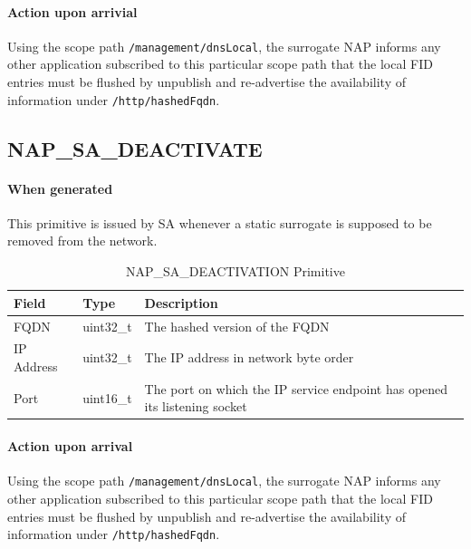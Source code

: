 \documentclass[a4paper,11pt,titlepage]{report}
\begin{document}
\paragraph{Action upon arrivial} Using the scope path \texttt{/management/dnsLocal}, the surrogate \ac{NAP} informs any other application subscribed to this particular scope path that the local \ac{FID} entries must be flushed by unpublish and re-advertise the availability of information under \texttt{/http/hashedFqdn}.

\subsection{NAP\_SA\_DEACTIVATE}

\paragraph{When generated} This primitive is issued by \ac{SA} whenever a static surrogate is supposed to be removed from the network.

\begin{table}[h]
	\centering
	\caption{NAP\_SA\_DEACTIVATION Primitive}\label{tab:NAP_SA_Deactivate}
	\begin{tabular}{| p{} | p{} | p{}|}
		\hline \textbf{Field} & \textbf{Type} & \textbf{Description} \\ 
		\hline FQDN & uint32\_t & The hashed version of the \acl{FQDN} \\ 
		\hline IP Address & uint32\_t & The IP address in network byte order \\ 
		\hline Port & uint16\_t & The port on which the IP service endpoint has opened its listening socket \\ 
		\hline 
	\end{tabular} 
\end{table}

\paragraph{Action upon arrival} Using the scope path \texttt{/management/dnsLocal}, the surrogate \ac{NAP} informs any other application subscribed to this particular scope path that the local \ac{FID} entries must be flushed by unpublish and re-advertise the availability of information under \texttt{/http/hashedFqdn}.
\end{document}
